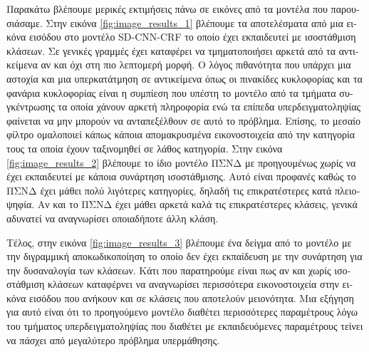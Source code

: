 \textgreek{Παρακάτω βλέπουμε μερικές εκτιμήσεις πάνω σε εικόνες από τα μοντέλα που παρουσιάσαμε. Στην εικόνα }\ref{fig:image_results_1} \textgreek{βλέπουμε τα αποτελέσματα από μια εικόνα εισόδου στο μοντέλο }SD-CNN-CRF \textgreek{το οποίο έχει εκπαιδευτεί με ισοστάθμιση κλάσεων. Σε γενικές γραμμές έχει καταφέρει να τμηματοποιήσει αρκετά από τα αντικείμενα αν και όχι στη πιο λεπτομερή μορφή. Ο λόγος πιθανότητα που υπάρχει μια αστοχία και μια υπερκατάτμηση σε αντικείμενα όπως οι πινακίδες κυκλοφορίας και τα φανάρια κυκλοφορίας είναι η συμπίεση που υπέστη το μοντέλο από τα τμήματα συγκέντρωσης τα οποία χάνουν αρκετή πληροφορία ενώ τα επίπεδα υπερδειγματοληψίας φαίνεται να μην μπορούν να ανταπεξέλθουν σε αυτό το πρόβλημα. Επίσης, το μεσαίο φίλτρο ομαλοποιεί κάπως κάποια απομακρυσμένα εικονοστοιχεία από την κατηγορία τους τα οποία έχουν ταξινομηθεί σε λάθος κατηγορία.} 
\newpage
\textgreek{Στην εικόνα }\ref{fig:image_results_2} \textgreek{βλέπουμε το ίδιο μοντέλο ΠΣΝΔ με προηγουμένως χωρίς να έχει εκπαιδευτεί με κάποια συνάρτηση ισοστάθμισης. Αυτό είναι προφανές καθώς το ΠΣΝΔ έχει μάθει πολύ λιγότερες κατηγορίες, δηλαδή τις επικρατέστερες κατά πλειοψηφία. Αν και το ΠΣΝΔ έχει μάθει αρκετά καλά τις επικρατέστερες κλάσεις, γενικά αδυνατεί να αναγνωρίσει οποιαδήποτε άλλη κλάση.}\par

\textgreek{Τέλος, στην εικόνα }\ref{fig:image_results_3} \textgreek{βλέπουμε ένα δείγμα από το μοντέλο με την διγραμμική αποκωδικοποίηση το οποίο δεν έχει εκπαίδευση με την συνάρτηση για την δυσαναλογία των κλάσεων. Κάτι που παρατηρούμε είναι πως αν και χωρίς ισοστάθμιση κλάσεων καταφέρνει να αναγνωρίσει περισσότερα εικονοστοιχεία στην εικόνα εισόδου που ανήκουν και σε κλάσεις που αποτελούν μειονότητα. Μια εξήγηση για αυτό είναι ότι το προηγούμενο μοντέλο διαθέτει περισσότερες παραμέτρους λόγω του τμήματος υπερδειγματοληψίας που διαθέτει με εκπαιδευόμενες παραμέτρους τείνει να πάσχει από μεγαλύτερο πρόβλημα υπερμάθησης.}


